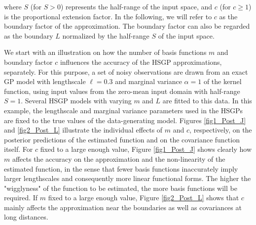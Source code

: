 \documentclass[onecolumn,a4paper,11pt]{article}
\begin{document}
\noindent where $S$ (for $S > 0$) represents the half-range of the input space, and $c$ (for $c \geq 1$) is the proportional extension factor. In the following, we will refer to $c$ as the boundary factor of the approximation. The boundary factor can also be regarded as the boundary $L$ normalized by the half-range $S$ of the input space.

We start with an illustration on how the number of basis functions $m$ and boundary factor $c$ influences the accuracy of the HSGP approximations, separately. For this purpose, a set of noisy observations are drawn from an exact GP model with lengthscale $\ell=0.3$ and marginal variance $\alpha=1$ of the kernel function, using input values from the zero-mean input domain with half-range $S=1$. Several HSGP models with varying $m$ and $L$ are fitted to this data. In this example, the lengthscale and marginal variance parameters used in the HSGPs are fixed to the true values of the data-generating model. 
Figures \ref{fig1_Post_J} and \ref{fig2_Post_L} illustrate the individual effects of $m$ and $c$, respectively, on the posterior predictions of the estimated function and on the covariance function itself. For $c$ fixed to a large enough value, Figure \ref{fig1_Post_J} shows clearly how $m$ affects the accuracy on the approximation and the non-linearity of the estimated function, in the sense that fewer basis functions inaccurately imply larger lengthscales and consequently more linear functional forms.
The higher the "wigglyness" of the function to be estimated, the more basis functions will be required. If $m$ fixed to a large enough value, Figure \ref{fig2_Post_L} shows that $c$ mainly affects the approximation near the boundaries as well as covariances at long distances.
\end{document}
